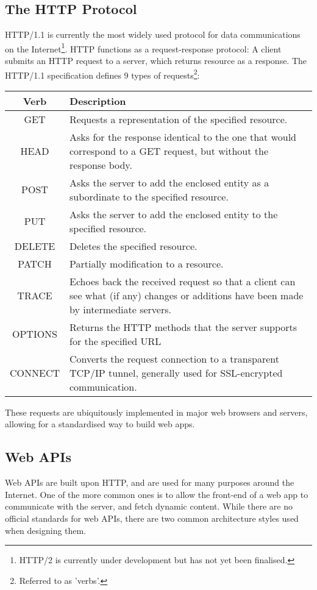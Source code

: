 \subsection{The HTTP Protocol}
HTTP/1.1 is currently the most widely used protocol for data communications on the Internet\footnote{HTTP/2 is currently under development but has not yet been finalised.}. HTTP functions as a request-response protocol: A client submits an HTTP request to a server, which returns resource as a response. The HTTP/1.1 specification defines 9 types of requests\footnote{Referred to as 'verbs'.}:
\begin{center}
\begin{tabular}{c | p{10cm}}
\textbf{Verb} & \textbf{Description} \\ \hline
GET & Requests a representation of the specified resource. \\
HEAD & Asks for the response identical to the one that would correspond to a GET request, but without the response body. \\
POST & Asks the server to add the enclosed entity as a subordinate to the specified resource. \\
PUT & Asks the server to add the enclosed entity to the specified resource. \\
DELETE & Deletes the specified resource. \\
PATCH & Partially modification to a resource. \\
TRACE & Echoes back the received request so that a client can see what (if any) changes or additions have been made by intermediate servers.\\
OPTIONS & Returns the HTTP methods that the server supports for the specified URL\\
CONNECT & Converts the request connection to a transparent TCP/IP tunnel, generally used for SSL-encrypted communication.\\
\end{tabular}
\end{center}
These requests are ubiquitously implemented in major web browsers and servers, allowing for a standardised way to build web apps.

\subsection{Web APIs}
Web APIs are built upon HTTP, and are used for many purposes around the Internet. One of the more common ones is to allow the front-end of a web app to communicate with the server, and fetch dynamic content. While there are no official standards for web APIs, there are two common architecture styles used when designing them.

